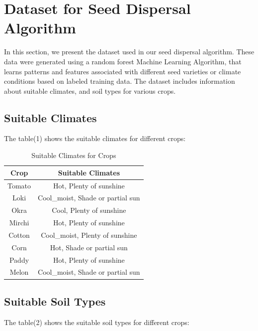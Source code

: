 \documentclass[conference]{IEEEtran}
\begin{document}
\section{Dataset for Seed Dispersal Algorithm}

In this section, we present the dataset used in our seed dispersal algorithm. These data were generated using a random forest Machine Learning Algorithm, that learns patterns and features associated with different seed varieties or climate conditions based on labeled training data. 
The dataset includes information about suitable climates, and soil types for various crops.

\subsection{Suitable Climates}

The table(1) shows the suitable climates for different crops:

\begin{table}[h]
  \centering
  \begin{tabular}{|c|c|}
    \hline
    \textbf{Crop} & \textbf{Suitable Climates} \\
    \hline
    Tomato & Hot, Plenty of sunshine \\
    Loki & Cool\_moist, Shade or partial sun \\
    Okra & Cool, Plenty of sunshine \\
    Mirchi & Hot, Plenty of sunshine \\
    Cotton & Cool\_moist, Plenty of sunshine \\
    Corn & Hot, Shade or partial sun \\
    Paddy & Hot, Plenty of sunshine \\
    Melon & Cool\_moist, Shade or partial sun \\
    \hline
  \end{tabular}
  \caption{Suitable Climates for Crops}
\end{table}

\subsection{Suitable Soil Types}

The table(2) shows the suitable soil types for different crops:
\end{document}
